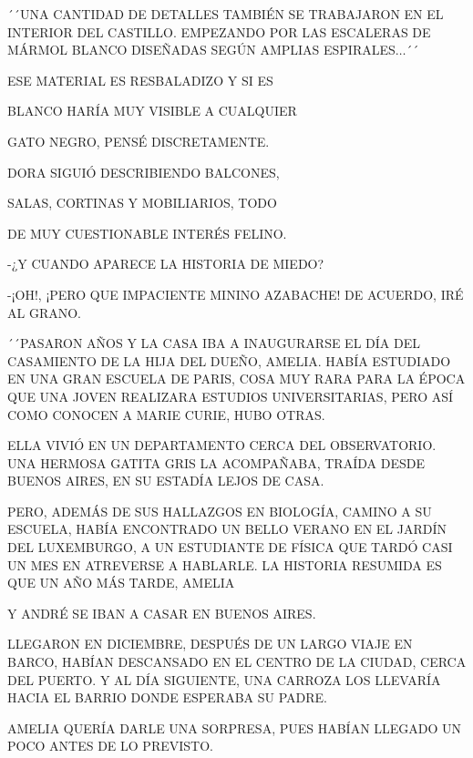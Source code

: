 ´´UNA CANTIDAD DE DETALLES TAMBIÉN SE TRABAJARON EN EL INTERIOR DEL CASTILLO. EMPEZANDO POR LAS ESCALERAS DE MÁRMOL BLANCO DISEÑADAS SEGÚN AMPLIAS ESPIRALES$\ldots$´´ 

ESE MATERIAL ES RESBALADIZO Y SI ES

BLANCO HARÍA MUY VISIBLE A CUALQUIER

GATO NEGRO, PENSÉ DISCRETAMENTE. 

DORA SIGUIÓ DESCRIBIENDO BALCONES,

SALAS,  CORTINAS Y MOBILIARIOS, TODO 

DE MUY CUESTIONABLE  INTERÉS FELINO.

-¿Y CUANDO APARECE LA HISTORIA DE MIEDO?

-¡OH!, ¡PERO QUE IMPACIENTE MININO AZABACHE!  DE ACUERDO, IRÉ AL GRANO.

´´PASARON AÑOS Y LA CASA IBA A INAUGURARSE EL DÍA DEL CASAMIENTO DE LA HIJA DEL DUEÑO, AMELIA. HABÍA ESTUDIADO EN UNA GRAN ESCUELA DE PARIS, COSA MUY RARA PARA LA ÉPOCA QUE UNA JOVEN REALIZARA ESTUDIOS UNIVERSITARIAS, PERO ASÍ COMO CONOCEN A MARIE CURIE, HUBO OTRAS.

ELLA VIVIÓ EN UN DEPARTAMENTO CERCA DEL OBSERVATORIO. UNA HERMOSA GATITA GRIS LA ACOMPAÑABA, TRAÍDA DESDE BUENOS AIRES,  EN SU ESTADÍA LEJOS DE CASA.

PERO, ADEMÁS DE SUS HALLAZGOS EN BIOLOGÍA, CAMINO A SU ESCUELA, HABÍA ENCONTRADO UN BELLO VERANO EN EL JARDÍN DEL LUXEMBURGO, A UN ESTUDIANTE DE FÍSICA QUE TARDÓ CASI UN MES EN ATREVERSE A HABLARLE. LA HISTORIA RESUMIDA ES QUE UN AÑO MÁS TARDE, AMELIA 


\newpage
{}
Y ANDRÉ SE IBAN A CASAR EN BUENOS AIRES.

LLEGARON EN DICIEMBRE, DESPUÉS DE UN LARGO VIAJE EN BARCO, HABÍAN DESCANSADO EN EL CENTRO DE LA CIUDAD, CERCA DEL PUERTO. Y AL DÍA SIGUIENTE, UNA CARROZA LOS LLEVARÍA HACIA EL BARRIO DONDE ESPERABA SU PADRE. 

\newpage
{}	
AMELIA QUERÍA DARLE UNA SORPRESA, PUES HABÍAN LLEGADO UN POCO ANTES DE LO PREVISTO. 

